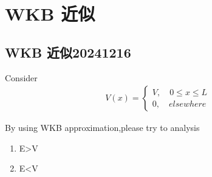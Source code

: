 \documentclass{article}
\begin{document}
\section{WKB 近似}
\subsection{WKB 近似20241216}
Consider 
\begin{align*}
    V(x)=
    \begin{cases}
        V,\quad 0\leq x\leq L\\
        0,\quad elsewhere
    \end{cases}
\end{align*}

By using WKB approximation,please try to analysis 
\begin{enumerate}
    \item E>V
    \item E<V
\end{enumerate}
\end{document}
